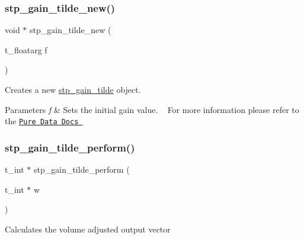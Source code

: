 \subsubsection{\texorpdfstring{stp\+\_\+gain\+\_\+tilde\+\_\+new()}{stp\_gain\_tilde\_new()}}
{\footnotesize\ttfamily void $\ast$ stp\+\_\+gain\+\_\+tilde\+\_\+new (\begin{DoxyParamCaption}\item[{t\+\_\+floatarg}]{f }\end{DoxyParamCaption})\hspace{0.3cm}{\ttfamily [related]}}



Creates a new \hyperlink{structstp__gain__tilde}{stp\+\_\+gain\+\_\+tilde} object.~\newline
 


\begin{DoxyParams}{Parameters}
{\em f} & Sets the initial gain value. ~\newline
 For more information please refer to the \href{https://github.com/pure-data/externals-howto}{\tt Pure Data Docs } ~\newline
 \\
\hline
\end{DoxyParams}
\mbox{\label{structstp__gain__tilde_a1c7d55f58651664bf47911a741858a89}} 
\subsubsection{\texorpdfstring{stp\+\_\+gain\+\_\+tilde\+\_\+perform()}{stp\_gain\_tilde\_perform()}}
{\footnotesize\ttfamily t\+\_\+int $\ast$ stp\+\_\+gain\+\_\+tilde\+\_\+perform (\begin{DoxyParamCaption}\item[{t\+\_\+int $\ast$}]{w }\end{DoxyParamCaption})\hspace{0.3cm}{\ttfamily [related]}}



Calculates the volume adjusted output vector~\newline
 


